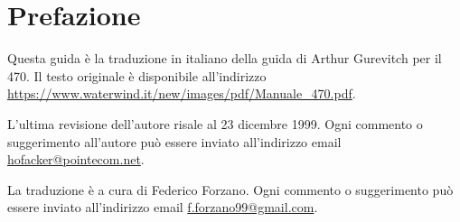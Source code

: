 \section{Prefazione}
\label{sec:Prefazione}
Questa guida è la traduzione in italiano della guida di Arthur Gurevitch per il
470. Il testo originale è disponibile all'indirizzo
\url{https://www.waterwind.it/new/images/pdf/Manuale_470.pdf}.

L'ultima revisione dell'autore risale al 23 dicembre 1999. Ogni commento o
suggerimento all'autore può essere inviato all'indirizzo email
\url{hofacker@pointecom.net}.

La traduzione è a cura di Federico Forzano. Ogni commento o suggerimento può
essere inviato all'indirizzo email \url{f.forzano99@gmail.com}.